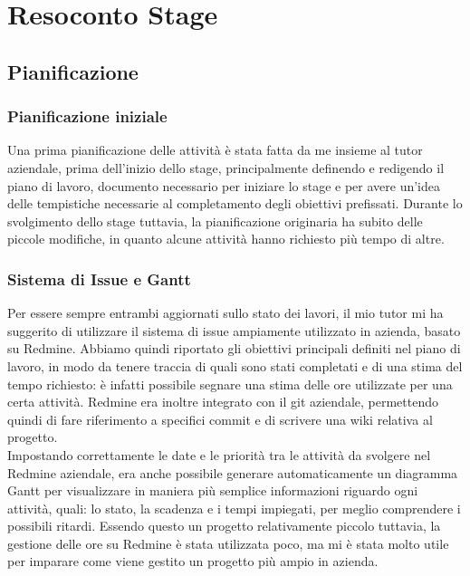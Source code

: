 
\chapter{Resoconto Stage}
\label{cap:resoconto-stage}

\section{Pianificazione}
\subsection{Pianificazione iniziale}\label{sec:pianificazione-iniziale}
Una prima pianificazione delle attività è stata fatta da me insieme al tutor aziendale, prima dell'inizio dello stage, principalmente definendo e redigendo il piano di lavoro, documento necessario per iniziare lo stage e per avere un'idea delle tempistiche necessarie al completamento degli obiettivi prefissati. Durante lo svolgimento dello stage tuttavia, la pianificazione originaria ha subito delle piccole modifiche, in quanto alcune attività hanno richiesto più tempo di altre. 

\subsection{Sistema di Issue e Gantt}
Per essere sempre entrambi aggiornati sullo stato dei lavori, il mio tutor mi ha suggerito di utilizzare il sistema di issue ampiamente utilizzato in azienda, basato su Redmine. Abbiamo quindi riportato gli obiettivi principali definiti nel piano di lavoro, in modo da tenere traccia di quali sono stati completati e di una stima del tempo richiesto: è infatti possibile segnare una stima delle ore utilizzate per una certa attività. Redmine era inoltre integrato con il git aziendale, permettendo quindi di fare riferimento a specifici commit e di scrivere una wiki relativa al progetto.
\\
Impostando correttamente le date e le priorità tra le attività da svolgere nel Redmine aziendale, era anche possibile generare automaticamente un diagramma Gantt per visualizzare in maniera più semplice informazioni riguardo ogni attività, quali: lo stato, la scadenza e i tempi impiegati, per meglio comprendere i possibili ritardi. Essendo questo un progetto relativamente piccolo tuttavia, la gestione delle ore su Redmine è stata utilizzata poco, ma mi è stata molto utile per imparare come viene gestito un progetto più ampio in azienda.

